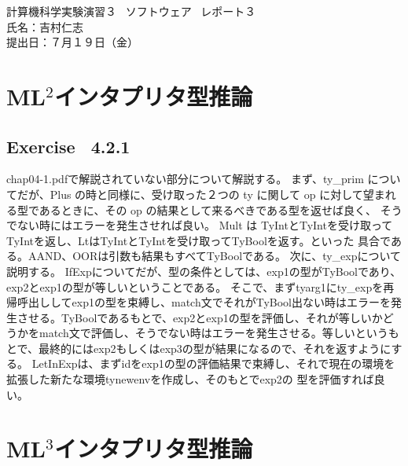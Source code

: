 \documentclass{jreport}
\begin{document}
\begin{center}
  計算機科学実験演習３ \ ソフトウェア \ レポート３  \\
  氏名：吉村仁志  \\
  提出日：７月１９日（金）
  \newpage
\end{center}
\chapter{ML$^2$インタプリタ型推論}
\section{Exercise \ 4.2.1}
chap04-1.pdfで解説されていない部分について解説する。
まず、ty\_prim についてだが、Plus の時と同様に、受け取った２つの ty に関して
op に対して望まれる型であるときに、その op の結果として来るべきである型を返せば良く、
そうでない時にはエラーを発生させれば良い。
Mult は TyIntとTyIntを受け取ってTyIntを返し、LtはTyIntとTyIntを受け取ってTyBoolを返す。といった
具合である。AAND、OORは引数も結果もすべてTyBoolである。
次に、ty\_expについて説明する。
IfExpについてだが、型の条件としては、exp1の型がTyBoolであり、exp2とexp1の型が等しいということである。
そこで、まずtyarg1にty\_expを再帰呼出ししてexp1の型を束縛し、match文でそれがTyBool出ない時はエラーを発生させる。TyBoolであるもとで、exp2とexp1の型を評価し、それが等しいかどうかをmatch文で評価し、そうでない時はエラーを発生させる。等しいというもとで、最終的にはexp2もしくはexp3の型が結果になるので、それを返すようにする。
LetInExpは、まずidをexp1の型の評価結果で束縛し、それで現在の環境を拡張した新たな環境tynewenvを作成し、そのもとでexp2の
型を評価すれば良い。
\chapter{ML$^3$インタプリタ型推論}
\end{document}

